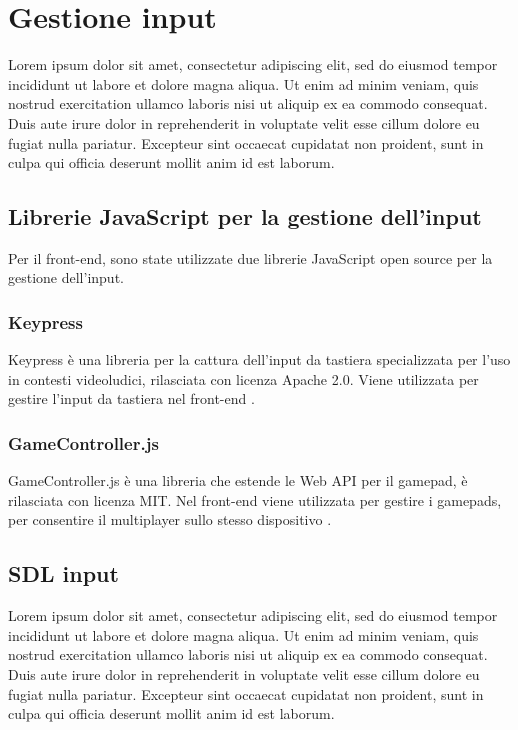 \section{Gestione input}
Lorem ipsum dolor sit amet, consectetur adipiscing elit, sed do eiusmod tempor incididunt ut labore et dolore magna aliqua. Ut enim ad minim veniam, quis nostrud exercitation ullamco laboris nisi ut aliquip ex ea commodo consequat. Duis aute irure dolor in reprehenderit in voluptate velit esse cillum dolore eu fugiat nulla pariatur. Excepteur sint occaecat cupidatat non proident, sunt in culpa qui officia deserunt mollit anim id est laborum.

\subsection{Librerie JavaScript per la gestione dell'input}
Per il front-end, sono state utilizzate due librerie JavaScript open source per la gestione dell'input.

\subsubsection{Keypress}
Keypress è una libreria per la cattura dell'input da tastiera specializzata per l'uso in contesti videoludici, rilasciata con licenza Apache 2.0. Viene utilizzata per gestire l'input da tastiera nel front-end \parencite{Keypress}.

\subsubsection{GameController.js}
GameController.js è una libreria che estende le Web API per il gamepad, è rilasciata con licenza MIT. Nel front-end viene utilizzata per gestire i gamepads, per consentire il multiplayer sullo stesso dispositivo \parencite{gameController_js}.


\subsection{SDL input}
Lorem ipsum dolor sit amet, consectetur adipiscing elit, sed do eiusmod tempor incididunt ut labore et dolore magna aliqua. Ut enim ad minim veniam, quis nostrud exercitation ullamco laboris nisi ut aliquip ex ea commodo consequat. Duis aute irure dolor in reprehenderit in voluptate velit esse cillum dolore eu fugiat nulla pariatur. Excepteur sint occaecat cupidatat non proident, sunt in culpa qui officia deserunt mollit anim id est laborum.



